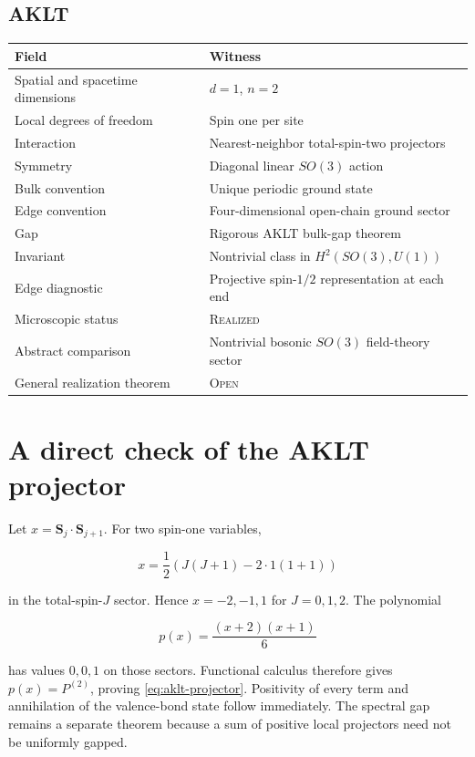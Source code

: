 \documentclass[12pt]{article}
\theoremstyle{definition}
\theoremstyle{remark}
\newcommand{\REAL}{\textnormal{\textsc{Realized}}}
\newcommand{\OPEN}{\textnormal{\textsc{Open}}}
\begin{document}
\subsection{AKLT}

\begin{longtable}{>{\raggedright\arraybackslash}p{}
                  >{\raggedright\arraybackslash}p{}}
\toprule
Field & Witness \\
\midrule
Spatial and spacetime dimensions & $d=1$, $n=2$ \\
Local degrees of freedom & Spin one per site \\
Interaction & Nearest-neighbor total-spin-two projectors \\
Symmetry & Diagonal linear $SO(3)$ action \\
Bulk convention & Unique periodic ground state \\
Edge convention & Four-dimensional open-chain ground sector \\
Gap & Rigorous AKLT bulk-gap theorem \\
Invariant & Nontrivial class in $H^2(SO(3),U(1))$ \\
Edge diagnostic & Projective spin-$1/2$ representation at each end \\
Microscopic status & \REAL{} \\
Abstract comparison & Nontrivial bosonic $SO(3)$ field-theory sector \\
General realization theorem & \OPEN{} \\
\bottomrule
\end{longtable}

\section{A direct check of the AKLT projector}

Let $x=\mathbf S_j\cdot\mathbf S_{j+1}$.  For two spin-one variables,

\begin{equation}
  x=\frac12\left(J(J+1)-2\cdot1(1+1)\right)
\end{equation}

in the total-spin-$J$ sector.  Hence $x=-2,-1,1$ for $J=0,1,2$.  The
polynomial

\begin{equation}
  p(x)=\frac{(x+2)(x+1)}6
\end{equation}

has values $0,0,1$ on those sectors.  Functional calculus therefore gives
$p(x)=P^{(2)}$, proving \cref{eq:aklt-projector}.  Positivity of every term
and annihilation of the valence-bond state follow immediately.  The
spectral gap remains a separate theorem because a sum of positive local
projectors need not be uniformly gapped.
\end{document}
